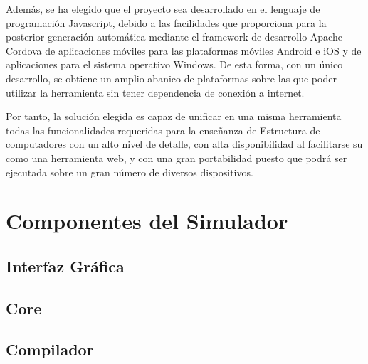 Además, se ha elegido que el proyecto sea desarrollado en el lenguaje de programación Javascript, debido a las facilidades que proporciona para la posterior generación automática mediante el framework de desarrollo Apache Cordova de aplicaciones móviles para las plataformas móviles Android e iOS y de aplicaciones para el sistema operativo Windows. De esta forma, con un único desarrollo, se obtiene un amplio abanico de plataformas sobre las que poder utilizar la herramienta sin tener dependencia de conexión a internet.

Por tanto, la solución elegida es capaz de unificar en una misma herramienta todas las funcionalidades requeridas para la enseñanza de Estructura de computadores con un alto nivel de detalle, con alta disponibilidad al facilitarse su como una herramienta web, y con una gran portabilidad puesto que podrá ser ejecutada sobre un gran número de diversos dispositivos.



\section{Componentes del Simulador}
\label{sec:simulator_components}


\subsection{Interfaz Gráfica}


\subsection{Core}


\subsection{Compilador}

